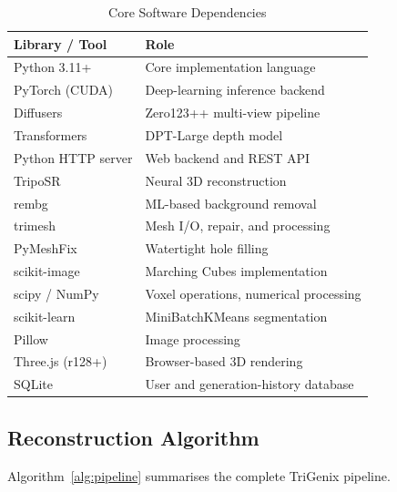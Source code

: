 \documentclass[conference]{IEEEtran}
\begin{document}
\begin{table}[htbp]
\caption{Core Software Dependencies}
\label{tab:software}
\centering
\begin{tabular}{ll}
\toprule
\textbf{Library / Tool} & \textbf{Role} \\
\midrule
Python 3.11+     & Core implementation language \\
PyTorch (CUDA)   & Deep-learning inference backend \\
Diffusers        & Zero123++ multi-view pipeline \\
Transformers     & DPT-Large depth model \\
Python HTTP server  & Web backend and REST API \\
TripoSR          & Neural 3D reconstruction \\
rembg            & ML-based background removal \\
trimesh          & Mesh I/O, repair, and processing \\
PyMeshFix        & Watertight hole filling \\
scikit-image     & Marching Cubes implementation \\
scipy / NumPy    & Voxel operations, numerical processing \\
scikit-learn     & MiniBatchKMeans segmentation \\
Pillow           & Image processing \\
Three.js (r128+) & Browser-based 3D rendering \\
SQLite           & User and generation-history database \\
\bottomrule
\end{tabular}
\end{table}

\subsection{Reconstruction Algorithm}

Algorithm~\ref{alg:pipeline} summarises the complete TriGenix pipeline.
\end{document}

